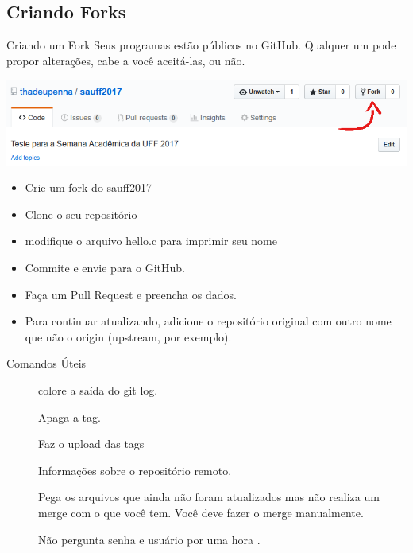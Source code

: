 \subsection{Criando Forks}
\begin{frame}{Criando um Fork}
Seus programas estão públicos no GitHub. Qualquer um pode propor alterações, cabe a você aceitá-las, ou não.
\begin{center}
	\includegraphics[width=\textwidth]{figures/fork}
\end{center}
\begin{itemize}
	\item Crie um fork do sauff2017
	\item Clone o seu repositório
	\item modifique o arquivo hello.c para imprimir seu nome
	\item Commite e envie para o GitHub.
	\item Faça um Pull Request e preencha os dados.
	\item Para continuar atualizando, adicione o repositório original com outro nome que não o origin (upstream, por exemplo).
\end{itemize}
\end{frame}


%
%
%
%
%

\begin{frame}[fragile]{Comandos Úteis}
\begin{description}
		\item[\color{red}] colore a saída do git log.
		\item[] Apaga a tag.
		\item[ ] Faz o upload das tags
		\item[] Informações sobre o repositório remoto.
		\item[] Pega os arquivos que ainda não foram atualizados mas não realiza um merge com o que você tem. Você deve fazer o merge manualmente.
        \item[] Não pergunta senha e usuário por uma hora .
\end{description}
\end{frame}
